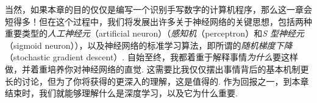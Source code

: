 当然，如果本章的目的仅仅是编写一个识别手写数字的计算机程序，那么这一章会短得多！但在这个过程中，我们将发展出许多关于神经网络的关键思想，包括两种重要类型的\emph{人工神经元}（artificial neuron）（\emph{感知机}（perceptron）和\emph{S 型神经元}（sigmoid neuron）），以及神经网络的标准学习算法，即所谓的\emph{随机梯度下降}（stochastic gradient descent）. 自始至终，我都着重于解释事情\emph{为什么}要这样做，并着重培养你对神经网络的直觉. 这需要比我仅仅摆出事情背后的基本机制更长的讨论，但为了你将获得的更深入的理解，这是值得的. 作为回报之一，到本章结束时，我们就能够理解什么是深度学习，以及它为什么重要.




